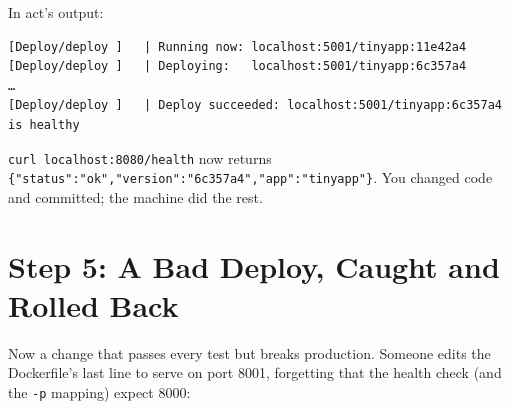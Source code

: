 \begin{codeblock}

\begin{Shaded}
\begin{Highlighting}[]
 
\end{Highlighting}
\end{Shaded}

\end{codeblock}


In act's output:

\begin{codeblock}
\begin{Verbatim}[formatcom=\outputstyle]
[Deploy/deploy ]   | Running now: localhost:5001/tinyapp:11e42a4
[Deploy/deploy ]   | Deploying:   localhost:5001/tinyapp:6c357a4
…
[Deploy/deploy ]   | Deploy succeeded: localhost:5001/tinyapp:6c357a4 is healthy
\end{Verbatim}
\end{codeblock}

\texttt{curl\ localhost:}\allowbreak{}\texttt{8080/}\allowbreak{}\texttt{health} now returns \texttt{\{"status":}\allowbreak{}\texttt{"ok",}\allowbreak{}\texttt{"version":}\allowbreak{}\texttt{"6c357a4",}\allowbreak{}\texttt{"app":}\allowbreak{}\texttt{"tinyapp"\}}. You changed code and committed; the machine did the rest.


\section{Step 5: A Bad Deploy, Caught and Rolled Back}\label{10-lab-deploy-on-every-push:step-5-a-bad-deploy-caught-and-rolled-back}

Now a change that passes every test but breaks production. Someone edits the Dockerfile's last line to serve on port 8001, forgetting that the health check (and the \texttt{-p} mapping) expect 8000:

\begin{codeblock}

\begin{Shaded}
\begin{Highlighting}[]
\NormalTok{ [}\NormalTok{, }\NormalTok{, }\NormalTok{, }\NormalTok{, }\NormalTok{, }\NormalTok{]}
\end{Highlighting}
\end{Shaded}

\end{codeblock}

